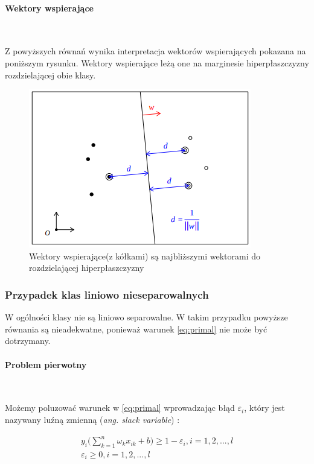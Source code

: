 \documentclass[paper=a4, fontsize=11pt]{scrartcl} %
\newcommand{\myparagraph}[1]{\paragraph{#1}\mbox{}\\}
\numberwithin{equation}{section} %
\numberwithin{figure}{section} %
\begin{document}
\myparagraph{Wektory wspierające}
    \par Z powyższych równań wynika interpretacja wektorów wspierających pokazana na poniższym rysunku.
		Wektory wspierające leżą one na marginesie hiperpłaszczyzny rozdzielającej obie klasy.

    \begin{figure}[H]
        \begin{center}
            \includegraphics[scale=0.8]{./img/suport_vectors.png}
            \caption{Wektory wspierające(z kółkami) są najbliższymi wektorami do rozdzielającej
            hiperpłaszczyzny \cite{nefedov2016support}}
        \end{center}
    \end{figure}


\subsubsection{Przypadek klas liniowo nieseparowalnych}
    \par W ogólności klasy nie są liniowo separowalne. W takim przypadku powyższe równania
    są nieadekwatne, ponieważ warunek  \ref{eq:primal} nie może być dotrzymany.

\myparagraph{Problem pierwotny}
    \par Możemy poluzować warunek w \ref{eq:primal} wprowadzając błąd $\varepsilon_i$, który 
    jest nazywany luźną zmienną (\textit{ang. slack variable}) \cite{nefedov2016support}:

    \begin{equation}
        \begin{split}
        y_i \bigg(\sum\limits_{k=1}^n \omega_k x_{ik} + b \bigg) \geq 1 - \varepsilon_i,
        i=1,2,...,l \\
        \varepsilon_i \geq 0, i=1,2,...,l
        \end{split}
    \end{equation}
\end{document}
